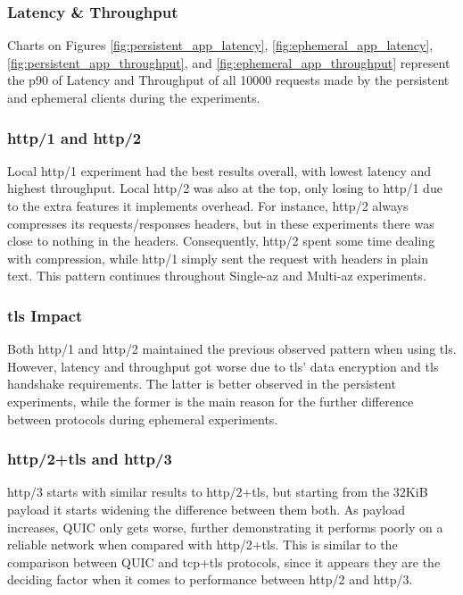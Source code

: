\subsubsection{Latency \& Throughput}

Charts on Figures \ref{fig:persistent_app_latency}, \ref{fig:ephemeral_app_latency}, \ref{fig:persistent_app_throughput}, and \ref{fig:ephemeral_app_throughput} represent the \gls{p90} of Latency and Throughput of all 10000 requests made by the persistent and ephemeral clients during the experiments.

\subsubsection*{\gls{http}/1 and \gls{http}/2}

Local \gls{http}/1 experiment had the best results overall, with lowest latency and highest throughput. Local \gls{http}/2 was also at the top, only losing to \gls{http}/1 due to the extra features it implements overhead. For instance, \gls{http}/2 always compresses its requests/responses headers, but in these experiments there was close to nothing in the headers. Consequently, \gls{http}/2 spent some time dealing with compression, while \gls{http}/1 simply sent the request with headers in plain text. This pattern continues throughout Single-\gls{az} and Multi-\gls{az} experiments.

\subsubsection*{\gls{tls} Impact}

Both \gls{http}/1 and \gls{http}/2 maintained the previous observed pattern when using \gls{tls}. However, latency and throughput got worse due to \gls{tls}’ data encryption and \gls{tls} handshake requirements. The latter is better observed in the persistent experiments, while the former is the main reason for the further difference between protocols during ephemeral experiments.

\subsubsection*{\gls{http}/2+\gls{tls} and \gls{http}/3}

\gls{http}/3 starts with similar results to \gls{http}/2+\gls{tls}, but starting from the 32KiB payload it starts widening the difference between them both. As payload increases, QUIC only gets worse, further demonstrating it performs poorly on a reliable network when compared with \gls{http}/2+\gls{tls}. This is similar to the comparison between QUIC and \gls{tcp}+\gls{tls} protocols, since it appears they are the deciding factor when it comes to performance between \gls{http}/2 and \gls{http}/3.

